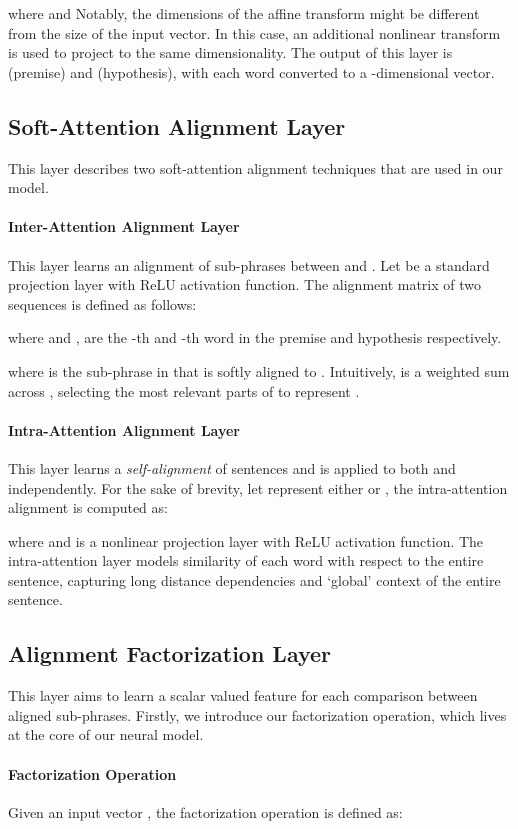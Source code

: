 \documentclass[11pt,a4paper]{article}
\begin{document}
 where  and  Notably, the dimensions of the affine transform might be different from the size of the input vector. In this case, an additional nonlinear transform is used to project  to the same dimensionality. The output of this layer is  (premise) and  (hypothesis), with each word converted to a -dimensional vector.

\subsection{Soft-Attention Alignment Layer}
This layer describes two soft-attention alignment techniques that are used in our model.
\paragraph{Inter-Attention Alignment Layer}
This layer learns an alignment of sub-phrases between  and . Let  be a standard projection layer with ReLU activation function. The alignment matrix of two sequences is defined as follows:

where  and ,  are the -th and -th word in the premise and hypothesis respectively.

where  is the sub-phrase in  that is softly aligned to .
Intuitively,  is a weighted sum across , selecting the most relevant parts of  to represent .

\paragraph{Intra-Attention Alignment Layer}
This layer learns a \textit{self-alignment} of sentences and is applied to both  and  independently. For the sake of brevity, let  represent either  or , the intra-attention alignment is computed as:

where  and  is a nonlinear projection layer with ReLU activation function. The intra-attention layer models similarity of each word with respect to the entire sentence, capturing long distance dependencies and `global' context of the entire sentence.

\subsection{Alignment Factorization Layer}
This layer aims to learn a scalar valued feature for each comparison between aligned sub-phrases. Firstly, we introduce our factorization operation, which lives at the core of our neural model.
\paragraph{Factorization Operation}
Given an input vector , the factorization operation \cite{rendle2010factorization} is defined as:
\end{document}
